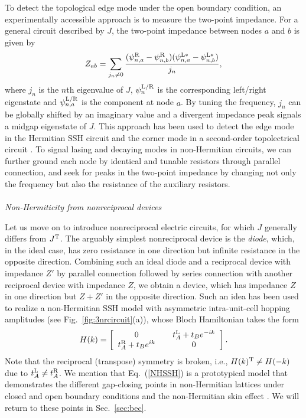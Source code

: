 \documentclass{tADP2e}
\theoremstyle{plain}
\theoremstyle{plain}
\theoremstyle{definition}
\begin{document}
To detect the topological edge mode under the open boundary condition, an experimentally accessible approach is to measure the two-point impedance. For a general circuit described by $J$, the two-point impedance between nodes $a$ and $b$ is given by \cite{CHL18}
\begin{equation}
Z_{ab}=\sum_{j_n\neq0}\frac{(\psi^{\rm R}_{n,a}-\psi^{\rm R}_{n,b})(\psi^{\rm L*}_{n,a}-\psi^{\rm L*}_{n,b})}{j_n},
\end{equation}
where $j_n$ is the $n$th eigenvalue of $J$, $\psi^{\rm L/R}_n$ is the corresponding left/right eigenstate and $\psi^{\rm L/R}_{n,a}$ is the component at node $a$. By tuning the frequency, $j_n$ can be globally shifted by an imaginary value and a divergent impedance peak signals a midgap eigenstate of $J$. This approach has been used to detect the edge mode in the Hermitian SSH circuit \cite{CHL18} and the corner mode in a second-order topolectrical circuit \cite{SI18}. To signal lasing and decaying modes in non-Hermitian circuits, we can further ground each node by identical and tunable resistors through parallel connection, and seek for peaks in the two-point impedance by changing not only the frequency but also the resistance of the auxiliary resistors.
\\ \\ {\it Non-Hermiticity from nonreciprocal devices}

\vspace{3pt}
\noindent
Let us move on to introduce nonreciprocal electric circuits, for which $J$ generally differs from $J^{\rm T}$. The arguably simplest nonreciprocal device is the \emph{diode}, which, in the ideal case, has zero resistance in one direction but infinite resistance in the opposite direction. Combining such an ideal diode and a reciprocal device with impedance $Z'$ by parallel connection followed by series connection with another reciprocal device with impedance $Z$, we obtain a device, which has impedance $Z$ in one direction but $Z+Z'$ in the opposite direction. Such an idea has been used to realize a non-Hermitian SSH model with asymmetric intra-unit-cell hopping amplitudes (see Fig.~\ref{fig:3nrcircuit}(a)), whose Bloch Hamiltonian takes the form \cite{EM19b}
\begin{equation}
H(k)=\begin{bmatrix} \;\;0\;\; & \;\;t^{\rm L}_A+t_Be^{-ik}\;\; \\ \;\;t^{\rm R}_A+t_Be^{ik}\;\; & \;\;0\;\; \end{bmatrix}.
\label{NHSSH}
\end{equation}
Note that the reciprocal (transpose) symmetry is broken, i.e., $H(k)^{\rm T}\neq H(-k)$ due to $t^{\rm L}_A\neq t^{\rm R}_A$. We mention that Eq.~(\ref{NHSSH}) is a prototypical model that demonstrates the different gap-closing points in non-Hermitian lattices under closed and open boundary conditions and the non-Hermitian skin effect \cite{YS18a}. We will return to these points in Sec.~\ref{sec:bec}.
\end{document}
